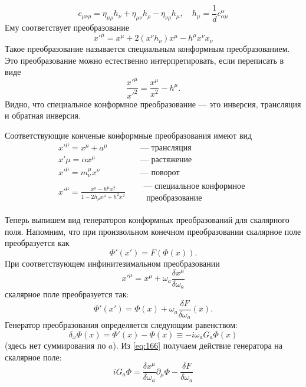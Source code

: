 \documentclass[a4paper,12pt]{article}
\theoremstyle{definition}
\theoremstyle{definition}
\theoremstyle{definition}
\begin{document}
\begin{equation}
  \label{eq:160}
  c_{\mu\nu\rho}=\eta_{\mu\rho} h_{\nu} +\eta_{\mu\nu}h_{\rho}-\eta_{\nu\rho}h_{\mu}, \quad h_{\mu}=\frac{1}{d} c^{\alpha}_{\alpha\mu}
\end{equation}
Ему соответствует преобразование
\begin{equation}
  \label{eq:161}
  x'^{\mu}=x^{\mu}+2 (x^{\nu}h_{\nu})x^{\mu} -h^{\mu} x^{\nu}x_{\nu}
\end{equation}
Такое преобразование называется специальным конформным преобразованием.
Это преобразование можно естественно интерпретировать, если переписать в виде
\begin{equation}
  \label{eq:162}
  \frac{x'^{\mu}}{x'^2}=\frac{x^{\mu}}{x^2}-h^{\mu}.
\end{equation}
Видно, что специальное конформное преобразование --- это инверсия, трансляция и обратная инверсия. 

Соответствующие конченые конформные преобразования имеют вид
\begin{eqnarray}
  \label{eq:163}
  x'^{\mu}=x^{\mu}+a^{\mu}&\quad \mbox{--- трансляция}\\
  x'{\mu}=\alpha x^{\mu} &\quad \mbox{--- растяжение}\\
  x'^{\mu}=m^{\mu}_{\nu} x^{\nu} &\quad \mbox{--- поворот}\\
  x'^{\mu}=\frac{x^{\mu}-h^{\mu}x^2}{1-2h_{\mu}x^{\mu}+h^2 x^2}  & \quad \begin{array}{c}\mbox{--- специальное конформное}\\ \mbox{ преобразование}\end{array}
\end{eqnarray}

Теперь выпишем вид генераторов конформных преобразований для скалярного поля. 
Напомним, что при произвольном конечном преобразовании скалярное поле преобразуется как
\begin{equation}
  \label{eq:164}
  \Phi'(x')=F(\Phi(x)).
\end{equation}
При соответствующем инфинитезимальном преобразовании
\begin{equation}
  \label{eq:165}
  x'^{\mu}=x^{\mu}+\omega_a \frac{\delta x^{\mu}}{\delta \omega_a}
\end{equation}
скалярное поле преобразуется так:
\begin{equation}
  \label{eq:166}
  \Phi'(x')=\Phi(x)+\omega_a \frac{\delta F}{\delta \omega_a} (x).
\end{equation}
Генератор преобразования определяется следующим равенством:
\begin{equation}
  \label{eq:167}
  \delta_{\omega} \Phi(x)=\Phi'(x)-\Phi(x)\equiv -i\omega_a G_a \Phi(x)
\end{equation}
(здесь нет суммирования по $a$). Из \eqref{eq:166} получаем действие генератора на скалярное поле:
\begin{equation}
  \label{eq:168}
  iG_a \Phi=\frac{\delta x^{\mu}}{\delta\omega_a} \partial_{\mu}\Phi-\frac{\delta F}{\delta \omega_a}
\end{equation}
\end{document}
